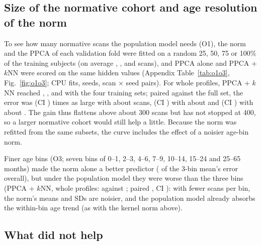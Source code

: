 \documentclass[11pt]{article}
\begin{document}
\subsection{Size of the normative cohort and age resolution of the norm}\label{sec:o1o3}

To see how many normative scans the population model needs (O1), the norm and the PPCA of each validation fold were fitted
on a random 25, 50, 75 or 100\% of the training subjects (on average \oNQ, \oNH, \oNT{} and \oNA{} scans), and PPCA alone
and PPCA + $k$NN were scored on the same hidden values (Appendix Table~\ref{tab:o1o3}, Fig.~\ref{fig:o1o3}; CPU fits,
\oOneSeeds{} seeds, \oOneScans{} scan $\times$ seed pairs). For whole profiles, PPCA + $k$NN reached \oQKnnWhole,
\oHKnnWhole, \oTKnnWhole{} and \oAKnnWhole{} with the four training sets; paired against the full set, the error was
\oPairQKnn{} (CI \oPairQKnnCi) times as large with about \oNQ{} scans, \oPairHKnn{} (CI \oPairHKnnCi) with about \oNH{} and
\oPairTKnn{} (CI \oPairTKnnCi) with about \oNT. The gain thus flattens above about 300 scans but has not stopped at 400,
so a larger normative cohort would still help a little. Because the norm was refitted from the same subsets, the curve
includes the effect of a noisier age-bin norm.

Finer age bins (O3; seven bins of 0--1, 2--3, 4--6, 7--9, 10--14, 15--24 and 25--65 months) made the norm alone a better
predictor (\oFNorm{} of the 3-bin mean's error overall), but under the population model they were worse than the three
bins (PPCA + $k$NN, whole profiles: \oFKnnWhole{} against \oAKnnWhole; paired \oPairFKnn, CI \oPairFKnnCi): with fewer scans
per bin, the norm's means and SDs are noisier, and the population model already absorbs the within-bin age trend (as with
the kernel norm above).

\subsection{What did not help}\label{sec:negative}

\begin{table}[t]
\centering\footnotesize
\caption{Quick held-out screen (one split, 30 test subjects, 2 rounds; 7 measures): best result per family and target,
selected on the test split itself; ``Runs'': configurations and test-time variants screened. Not comparable with
Table~\ref{tab:main}.}\label{tab:screens}
\setlength{\tabcolsep}{4pt}

\end{table}
\end{document}
